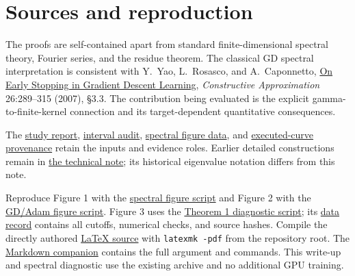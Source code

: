\documentclass[11pt]{article}
\theoremstyle{definition}
\newcommand{\repo}{https://github.com/samlayton99/precision-mlps/blob/experiment/frozen-gamma-probe}
\newcommand{\evidence}{\repo/results/checkpoint_D_optimizers/expD36_frozen_gamma_probe/full_sweep/refinements/gamma_factorized_kernel}
\begin{document}
\begingroup\small
\section*{Sources and reproduction}
The proofs are self-contained apart from standard finite-dimensional spectral
theory, Fourier series, and the residue theorem. The classical GD spectral
interpretation is consistent with Y.~Yao, L.~Rosasco, and A.~Caponnetto,
\href{https://yao-lab.github.io/publications/YaoCapRos07_EarlyStop.pdf}{On Early
Stopping in Gradient Descent Learning}, \textit{Constructive Approximation}
26:289--315 (2007), \S3.3. The contribution being evaluated is the explicit
gamma-to-finite-kernel connection and its target-dependent quantitative consequences.

The \href{\evidence/REPORT.md}{study report},
\href{\evidence/interval_audit.json}{interval audit},
\href{\evidence/spectral_bridge_data.json}{spectral figure data}, and
\href{\evidence/pi_brief_figure_data.json}{executed-curve provenance} retain
the inputs and evidence roles. Earlier detailed constructions remain in
\href{\repo/docs/gamma_factorized_readout.md}{the technical note}; its
historical eigenvalue notation differs from this note.

Reproduce Figure 1 with the
\href{\repo/experiments/expD36_frozen_gamma_probe/spectral_bridge_figure.py}{spectral figure script}
and Figure 2 with the
\href{\repo/experiments/expD36_frozen_gamma_probe/pi_brief_figure.py}{GD/Adam figure script}.
Figure 3 uses the
\href{\repo/experiments/expD36_frozen_gamma_probe/theorem1_spectral_probe.py}{Theorem 1 diagnostic script};
its \href{\evidence/theorem1_spectral_probe.json}{data record} contains all
cutoffs, numerical checks, and source hashes.
Compile the directly authored
\href{\repo/docs/gamma_optimization_full_note.tex}{LaTeX source}
with \texttt{latexmk -pdf} from the repository root. The
\href{\repo/docs/gamma_optimization_full_note.md}{Markdown companion}
contains the full argument and commands. This write-up and spectral
diagnostic use the existing archive and no additional GPU training.
\endgroup
\end{document}
